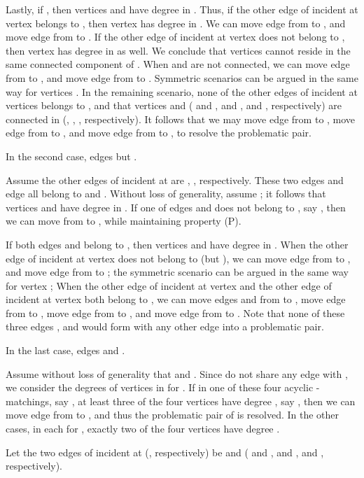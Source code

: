 \documentclass[11pt,twoside]{article}\usepackage{amssymb,latexsym,graphicx,hyperref}\usepackage{epstopdf}
\newenvironment{proof}{{\sc Proof. }}{\hfill\vspace{0.2in}}
\begin{document}
\begin{proof}
Lastly, if , then vertices  and  have degree  in .
Thus, if the other edge of  incident at vertex  belongs to , then vertex  has degree  in .
We can move edge  from  to , and move edge  from  to .
If the other edge of  incident at vertex  does not belong to , then vertex  has degree  in  as well.
We conclude that vertices  cannot reside in the same connected component of .
When  and  are not connected, we can move edge  from  to , and move edge  from  to .
Symmetric scenarios can be argued in the same way for vertices .
In the remaining scenario, none of the other edges of  incident at vertices  belongs to ,
and that vertices  and  ( and ,  and ,  and , respectively) are connected in 
(, , , respectively).
It follows that we may move edge  from  to , move edge  from  to ,
and move edge  from  to , to resolve the problematic pair.


In the second case, edges  but .

Assume the other edges of  incident at  are , , respectively.
These two edges and edge  all belong to  and .
Without loss of generality, assume ;
it follows that vertices  and  have degree  in .
If one of edges  and  does not belong to , say , then we can move  from  to ,
while maintaining property (P).


If both edges  and  belong to , then vertices  and  have degree  in .
When the other edge of  incident at vertex  does not belong to  (but ),
we can move edge  from  to , and move edge  from  to ;
the symmetric scenario can be argued in the same way for vertex ;
When the other edge of  incident at vertex  and the other edge of  incident at vertex  both belong to ,
we can move edges  and  from  to ,
move edge  from  to ,
move edge  from  to ,
and move edge  from  to .
Note that none of these three edges ,  and  would form with any other edge into a problematic pair.


In the last case, edges  and .

Assume without loss of generality that  and .
Since  do not share any edge with , we consider the degrees of vertices  in  for .
If in one of these four acyclic -matchings, say , at least three of the four vertices have degree , say ,
then we can move edge  from  to , and thus the problematic pair of  is resolved.
In the other cases, in each  for , exactly two of the four vertices have degree .

Let the two edges of  incident at  (, respectively) be  and  ( and ,
 and ,  and , respectively).


\end{proof}
\end{document}
